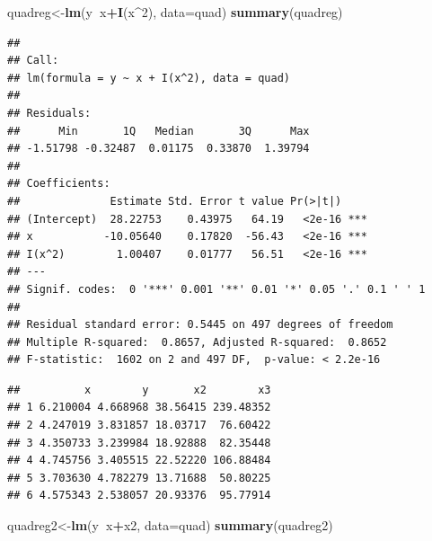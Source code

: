 \documentclass[]{book}
\newenvironment{Shaded}{\begin{snugshade}}{\end{snugshade}}
\newcommand{\KeywordTok}[1]{\textcolor[rgb]{0.13,0.29,0.53}{\textbf{#1}}}
\newcommand{\DataTypeTok}[1]{\textcolor[rgb]{0.13,0.29,0.53}{#1}}
\newcommand{\DecValTok}[1]{\textcolor[rgb]{0.00,0.00,0.81}{#1}}
\newcommand{\StringTok}[1]{\textcolor[rgb]{0.31,0.60,0.02}{#1}}
\newcommand{\OperatorTok}[1]{\textcolor[rgb]{0.81,0.36,0.00}{\textbf{#1}}}
\newcommand{\NormalTok}[1]{#1}
\theoremstyle{definition}
\theoremstyle{definition}
\theoremstyle{definition}
\theoremstyle{remark}
\begin{document}
\begin{Shaded}
\begin{Highlighting}[]
\NormalTok{quadreg<-}\KeywordTok{lm}\NormalTok{(y}\OperatorTok{~}\NormalTok{x}\OperatorTok{+}\KeywordTok{I}\NormalTok{(x}\OperatorTok{^}\DecValTok{2}\NormalTok{), }\DataTypeTok{data=}\NormalTok{quad)}
\KeywordTok{summary}\NormalTok{(quadreg)}
\end{Highlighting}
\end{Shaded}

\begin{verbatim}
## 
## Call:
## lm(formula = y ~ x + I(x^2), data = quad)
## 
## Residuals:
##      Min       1Q   Median       3Q      Max 
## -1.51798 -0.32487  0.01175  0.33870  1.39794 
## 
## Coefficients:
##              Estimate Std. Error t value Pr(>|t|)    
## (Intercept)  28.22753    0.43975   64.19   <2e-16 ***
## x           -10.05640    0.17820  -56.43   <2e-16 ***
## I(x^2)        1.00407    0.01777   56.51   <2e-16 ***
## ---
## Signif. codes:  0 '***' 0.001 '**' 0.01 '*' 0.05 '.' 0.1 ' ' 1
## 
## Residual standard error: 0.5445 on 497 degrees of freedom
## Multiple R-squared:  0.8657, Adjusted R-squared:  0.8652 
## F-statistic:  1602 on 2 and 497 DF,  p-value: < 2.2e-16
\end{verbatim}

\begin{Shaded}
\end{Shaded}

\begin{verbatim}
##          x        y       x2        x3
## 1 6.210004 4.668968 38.56415 239.48352
## 2 4.247019 3.831857 18.03717  76.60422
## 3 4.350733 3.239984 18.92888  82.35448
## 4 4.745756 3.405515 22.52220 106.88484
## 5 3.703630 4.782279 13.71688  50.80225
## 6 4.575343 2.538057 20.93376  95.77914
\end{verbatim}

\begin{Shaded}
\begin{Highlighting}[]
\NormalTok{quadreg2<-}\KeywordTok{lm}\NormalTok{(y}\OperatorTok{~}\NormalTok{x}\OperatorTok{+}\NormalTok{x2, }\DataTypeTok{data=}\NormalTok{quad)}
\KeywordTok{summary}\NormalTok{(quadreg2)}
\end{Highlighting}
\end{Shaded}
\end{document}
